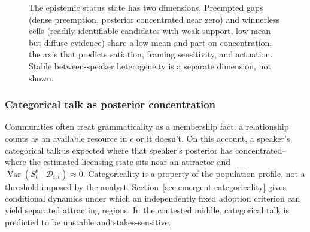 \begin{figure}[t]
\centering
{}
\caption{The epistemic status state has two dimensions. Preempted gaps (dense
preemption, posterior concentrated near zero) and winnerless cells (readily identifiable
candidates with weak support, low mean but diffuse evidence) share a low mean and part on
concentration, the axis that predicts satiation, framing sensitivity, and
actuation. Stable between-speaker heterogeneity is a separate dimension, not
shown.}
\label{fig:state-space}
\end{figure}

\subsubsection{Categorical talk as posterior concentration}
\label{sec:categorical-talk}

Communities often treat grammaticality as a membership fact: a relationship
counts as an available resource in $c$ or it doesn't. On this account, a
speaker's categorical talk is expected where that speaker's posterior has
concentrated--where the estimated licensing state sits near an attractor and
$\operatorname{Var}(S_t^{\theta}\mid\mathcal{D}_{i,t})\approx0$. Categoricality is a
property of the population profile, not a threshold imposed by the analyst.
Section~\ref{sec:emergent-categoricality} gives conditional dynamics under
which an independently fixed adoption criterion can yield separated attracting
regions. In the contested middle, categorical talk is predicted to be unstable
and stakes-sensitive.

